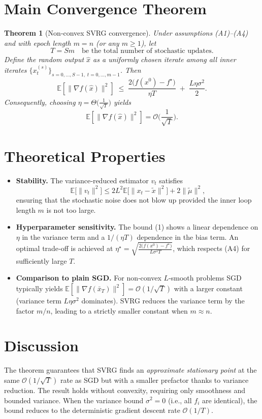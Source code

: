 \documentclass{article}
\newtheorem{theorem}{Theorem}
\newcommand{\E}{\mathbb{E}}
\begin{document}
\section*{Main Convergence Theorem}
\begin{theorem}[Non‑convex SVRG convergence]\label{thm:svrg}
Under assumptions (A1)–(A4) and with epoch length $m=n$ (or any $m\ge 1$), let
\[
T = Sm\quad\text{be the total number of stochastic updates.}
\]
Define the random output $\hat{x}$ as a uniformly chosen iterate among all inner iterates
$\{x_t^{(s)}\}_{s=0,\dots,S-1,\;t=0,\dots,m-1}$. Then
\[
\E\!\left[\|\nabla f(\hat{x})\|^{2}\right]
\;\le\;
\frac{2\big(f(x^{0})-f^{\star}\big)}{\eta T}
\;+\;
\frac{L\eta\sigma^{2}}{2}. \tag{1}
\]
Consequently, choosing $\eta = \Theta\!\big(\frac{1}{\sqrt{T}}\big)$ yields
\[
\E\!\left[\|\nabla f(\hat{x})\|^{2}\right]=\mathcal{O}\!\bigg(\frac{1}{\sqrt{T}}\bigg).
\]
\end{theorem}

\section*{Theoretical Properties}
\begin{itemize}
\item \textbf{Stability.} The variance‑reduced estimator $v_t$ satisfies
\[
\E\big[\|v_t\|^{2}\big]\le 2L^{2}\E\big[\|x_t-\tilde{x}\|^{2}\big]+2\|\tilde{\mu}\|^{2},
\]
ensuring that the stochastic noise does not blow up provided the inner loop length $m$ is not too large.
\item \textbf{Hyperparameter sensitivity.} The bound (1) shows a linear dependence on $\eta$ in the variance term and a $1/(\eta T)$ dependence in the bias term. An optimal trade‑off is achieved at $\eta^{\star}= \sqrt{\frac{2\big(f(x^{0})-f^{\star}\big)}{L\sigma^{2}T}}$, which respects (A4) for sufficiently large $T$.
\item \textbf{Comparison to plain SGD.} For non‑convex $L$‑smooth problems SGD typically yields $\E[\|\nabla f(\bar{x}_T)\|^{2}]=\mathcal{O}(1/\sqrt{T})$ with a larger constant (variance term $L\eta\sigma^{2}$ dominates). SVRG reduces the variance term by the factor $m/n$, leading to a strictly smaller constant when $m\approx n$.
\end{itemize}

\section*{Discussion}
The theorem guarantees that SVRG finds an \emph{approximate stationary point} at the same $\mathcal{O}(1/\sqrt{T})$ rate as SGD but with a smaller prefactor thanks to variance reduction. The result holds without convexity, requiring only smoothness and bounded variance. When the variance bound $\sigma^{2}=0$ (i.e., all $f_i$ are identical), the bound reduces to the deterministic gradient descent rate $\mathcal{O}(1/T)$.
\end{document}
